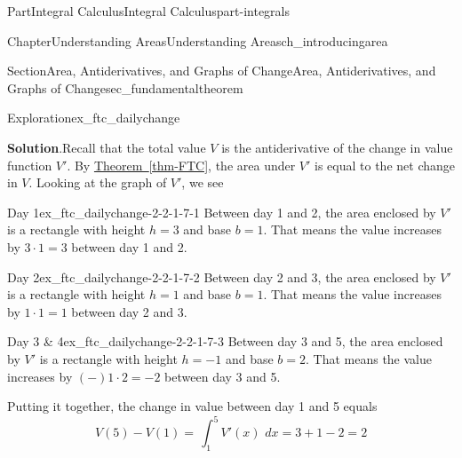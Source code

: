 \documentclass[oneside,10pt,]{tufte-book}
\newcommand{\blocktitlefont}{\relax}
\newcommand{\xreffont}{\relax}
\numberwithin{equation}{chapter}
\newcommand{\intdx}[1]{{\,\int#1\,\,dx}}
\newcommand{\dint}[1]{\displaystyle\intdx{#1}}
\begin{document}
\begin{partptx}{Part}{Integral Calculus}{}{Integral Calculus}{}{}{part-integrals}
\begin{chapterptx}{Chapter}{Understanding Areas}{}{Understanding Areas}{}{}{ch_introducingarea}
\begin{sectionptx}{Section}{Area, Antiderivatives, and Graphs of Change}{}{Area, Antiderivatives, and Graphs of Change}{}{}{sec_fundamentaltheorem}
\begin{exploration}{Exploration}{}{ex_ftc_dailychange}
\begin{enumerate}[font=\bfseries,label=(\alph*),ref=\alph*]
\par\smallskip%
\noindent\textbf{\blocktitlefont Solution}.\hypertarget{ex_ftc_dailychange-2-2}{}\quad{}Recall that the total value \(V\) is the antiderivative of the change in value function  \(V'\). By \hyperref[thm-FTC]{Theorem~{\xreffont\ref{thm-FTC}}}, the area under \(V'\) is equal to the net change in \(V\).  Looking at the graph of \(V'\), we see%
\begin{descriptionlist}
\begin{dlimedium}{Day 1}{ex_ftc_dailychange-2-2-1-7-1}%
Between day 1 and 2, the area enclosed by \(V'\) is a rectangle with height \(h=3\) and base \(b=1\). That means the value increases by \(3\cdot 1= 3\)\textdollar{} between day 1 and 2.%
\end{dlimedium}%
\begin{dlimedium}{Day 2}{ex_ftc_dailychange-2-2-1-7-2}%
Between day 2 and 3, the area enclosed by \(V'\) is a rectangle with height \(h=1\) and base \(b=1\). That means the value increases by \(1\cdot 1 = 1\)\textdollar{} between day 2 and 3.%
\end{dlimedium}%
\begin{dlimedium}{Day 3 \& 4}{ex_ftc_dailychange-2-2-1-7-3}%
Between day 3 and 5, the area enclosed by \(V'\) is a rectangle with height \(h=-1\) and base \(b=2\). That means the value increases by \((-) 1\cdot 2 = -2 \)\textdollar{} between day 3 and 5.%
\end{dlimedium}%
\end{descriptionlist}
Putting it together, the change in value between day 1 and 5 equals%
\begin{equation*}
V(5)-V(1) = \dint{_1^5 V'(x) } = 3 + 1 - 2 = 2
\end{equation*}
%
\begin{image}{0.25}{0.5}{0.25}{}%
\end{image}
\end{enumerate}
\end{exploration}
\end{sectionptx}
\end{chapterptx}
\end{partptx}
\end{document}
